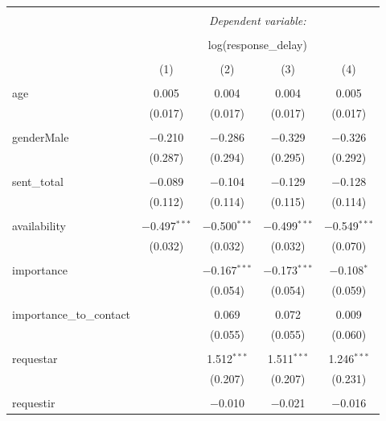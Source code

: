 \documentclass[12pt]{nuthesis}	%
\begin{document}
\begin{table}[!htbp] \fontsize{7}{7.5}\selectfont \centering 
\begin{tabular}{@{\extracolsep{5pt}}lcccc} 
\\[-1.8ex]\hline 
\hline \\[-1.8ex] 
 & \multicolumn{4}{c}{\textit{Dependent variable:}} \\ 
\cline{2-5} 
\\[-1.8ex] & \multicolumn{4}{c}{log(response\_delay)} \\ 
\\[-1.8ex] & (1) & (2) & (3) & (4)\\ 
\hline \\[-1.8ex] 
 age & 0.005 & 0.004 & 0.004 & 0.005 \\ 
  & (0.017) & (0.017) & (0.017) & (0.017) \\ 
  & & & & \\ 
 genderMale & $-$0.210 & $-$0.286 & $-$0.329 & $-$0.326 \\ 
  & (0.287) & (0.294) & (0.295) & (0.292) \\ 
  & & & & \\ 
 sent\_total & $-$0.089 & $-$0.104 & $-$0.129 & $-$0.128 \\ 
  & (0.112) & (0.114) & (0.115) & (0.114) \\ 
  & & & & \\ 
 availability & $-$0.497$^{***}$ & $-$0.500$^{***}$ & $-$0.499$^{***}$ & $-$0.549$^{***}$ \\ 
  & (0.032) & (0.032) & (0.032) & (0.070) \\ 
  & & & & \\ 
 importance &  & $-$0.167$^{***}$ & $-$0.173$^{***}$ & $-$0.108$^{*}$ \\ 
  &  & (0.054) & (0.054) & (0.059) \\ 
  & & & & \\ 
 importance\_to\_contact &  & 0.069 & 0.072 & 0.009 \\ 
  &  & (0.055) & (0.055) & (0.060) \\ 
  & & & & \\ 
 requestar &  & 1.512$^{***}$ & 1.511$^{***}$ & 1.246$^{***}$ \\ 
  &  & (0.207) & (0.207) & (0.231) \\ 
  & & & & \\ 
 requestir &  & $-$0.010 & $-$0.021 & $-$0.016 \\ 

\end{tabular}
\end{table}
\end{document}
